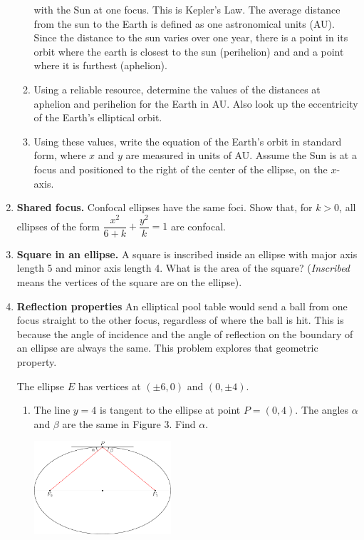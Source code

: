 \documentclass[11pt]{article}
\begin{document}
\begin{enumerate}
\begin{enumerate}
    with the Sun at one focus. This is Kepler's Law. The average distance from
    the sun to the Earth is defined as one astronomical units (AU).
    Since the distance to the sun varies over one year, there is a point in its orbit
		where the earth is
    closest to the sun (perihelion) and and a point where it is furthest (aphelion).
  \item
    Using a reliable resource, determine the values of the distances at
    aphelion and perihelion for the Earth in AU. Also look up the eccentricity of the
		Earth's elliptical orbit.
  \item
    Using these values, write the equation of the Earth's orbit in
    standard form, where \(x\) and \(y\) are measured in units of AU.
    Assume the Sun is at a focus and positioned to the right of the center of the
    ellipse, on the \(x\)-axis.
  \end{enumerate}
\item
  \textbf{Shared focus.}
	Confocal ellipses have the same foci. Show that, for \(k>0\), all
  ellipses of the form \(\dfrac{x^2}{6+k}+\dfrac{y^2}{k}=1\) are
  confocal.
\item
  \textbf{Square in an ellipse.}
	A square is inscribed inside an ellipse with major axis length 5 and
  minor axis length 4. What is the area of the square? (\emph{Inscribed}
  means the vertices of the square are on the ellipse).
\item
	\textbf{Reflection properties}
	An elliptical pool table would send a ball from one focus straight to the other focus, regardless
	of where the ball is hit. This is because the angle of incidence and the angle of reflection
	on the boundary of an ellipse are always the same. This problem explores that geometric property.

	The ellipse \(E\) has vertices at \((\pm 6,0)\) and \((0, \pm 4)\).

	\begin{enumerate}
	\item
  The line \(y=4\) is tangent to the ellipse at point \(P = (0,4)\). The
  angles \(\alpha\) and \(\beta\) are the same in Figure 3. Find
  \(\alpha\). \\
	\begin{center}
		\includegraphics*[width=2in]{ellipse2.pdf}
	\end{center}


\end{enumerate}
\end{enumerate}
\end{document}
